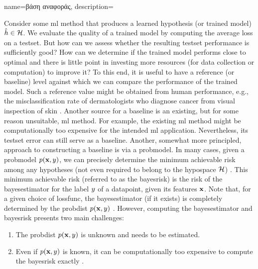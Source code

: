 {name={\foreignlanguage{greek}{βάση αναφοράς}},
    description={Consider some \gls{ml} method that produces a learned 
    	\gls{hypothesis} (or trained \gls{model}) $\hat{h} \in \mathcal{H}$. We evaluate the quality of a trained \gls{model} 
    by computing the average \gls{loss} on a \gls{testset}. But how can we assess 
    whether the resulting \gls{testset} performance is sufficiently good? How can we 
    determine if the trained \gls{model} performs close to optimal and there is little point 
    in investing more resources (for \gls{data} collection or computation) to improve it? 
    To this end, it is useful to have a reference (or baseline) level against which 
    we can compare the performance of the trained \gls{model}. Such a reference value 
    might be obtained from human performance, e.g., the misclassification rate of dermatologists 
    who diagnose cancer from visual inspection of skin \cite{SkinHumanAI}. Another source for a baseline is an existing, 
    but for some reason unsuitable, \gls{ml} method. For example, the existing \gls{ml} method 
    might be computationally too expensive for the intended \gls{ml} application. 
    Nevertheless, its \gls{testset} error can still serve as a baseline. Another, somewhat more principled, 
    approach to constructing a baseline is via a \gls{probmodel}. In many cases, given a \gls{probmodel} $p({\bf x},y)$,  
    we can precisely determine the \gls{minimum} achievable \gls{risk} among any hypotheses
    (not even required to belong to the \gls{hypospace} $\mathcal{H}$) \cite{LC}. 
    This \gls{minimum} achievable \gls{risk} (referred to as the \gls{bayesrisk}) is the \gls{risk} 
    of the \gls{bayesestimator} for the \gls{label} $y$ of a \gls{datapoint}, given
    its \gls{feature}s ${\bf x}$. Note that, for a given choice of \gls{lossfunc}, the 
    \gls{bayesestimator} (if it exists) is completely determined by the \gls{probdist} $p({\bf x},y)$ \cite[Ch. 4]{LC}. 
    However, computing the \gls{bayesestimator} and \gls{bayesrisk} presents two 
    main challenges:
    \begin{enumerate}[label=\arabic*)]
    	\item The \gls{probdist} $p({\bf x},y)$ is unknown and 
    needs to be estimated.
    	\item Even if $p({\bf x},y)$ is known, 
    it can be computationally too expensive to compute the \gls{bayesrisk} exactly \cite{cooper1990computational}. 

\end{enumerate}}}
